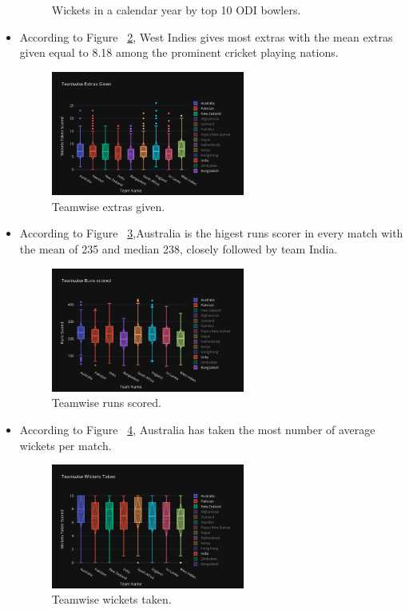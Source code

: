 \documentclass[fleqn,10pt]{wlscirep}
\begin{document}
\begin{itemize}
\begin{figure}[h]
        \caption{Wickets in a calendar year by top 10 ODI bowlers.}
        \label{fig:seven}
      \end{figure}
      \item According to Figure ~\ref{fig:eight}, West Indies gives most extras with the mean extras given equal to 8.18 among the prominent cricket playing nations.
      \begin{figure}[h]
        \centering
        \includegraphics[width=0.6\textwidth]{teamextras.png}
        \caption{Teamwise extras given. }
        \label{fig:eight}
      \end{figure}
      \item According to Figure ~\ref{fig:nine},Australia is the higest runs scorer in every match with the mean of 235 and median 238, closely followed by team India.
      \begin{figure}[h]
        \centering
        \includegraphics[width=0.6\textwidth]{teamruns.png}
        \caption{Teamwise runs scored.}
        \label{fig:nine}
      \end{figure}
      \item According to Figure ~\ref{fig:ten}, Australia has taken the most number of average wickets per match.
      \begin{figure}[h]
        \centering
        \includegraphics[width=0.6\textwidth]{teamwic.png}
        \caption{Teamwise wickets taken.}
        \label{fig:ten}
      \end{figure}
      

\end{itemize}
\end{document}
